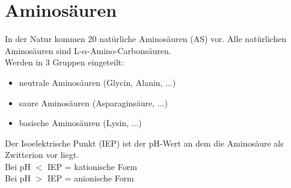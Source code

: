 \section{Aminosäuren}
In der Natur kommen 20 natürliche Aminosäuren (AS) vor.
Alle natürlichen Aminosäuren sind L-$\alpha$-Amino-Carbonsäuren. \\
Werden in 3 Gruppen eingeteilt:
\begin{itemize}
    \item neutrale Aminosäuren (Glycin, Alanin, ...)
    \item saure Aminosäuren (Asparaginsäure, ...)
    \item basische Aminosäuren (Lysin, ...)
\end{itemize}
Der Isoelektrische Punkt (IEP) ist der pH-Wert an dem die Aminosäure als Zwitterion vor liegt. \\
Bei pH $<$ IEP = kationische Form \\
Bei pH $>$ IEP = anionische Form


